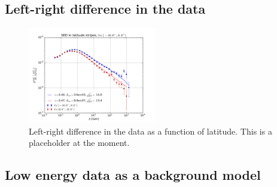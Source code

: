 \subsection{Left-right difference in the data}
\label{sec:data_diff}



\begin{figure}[h]
 \includegraphics[width=0.5\textwidth]{plots/Section3_left_right_difference.pdf}
 \caption{Left-right difference in the data as a function of latitude. This is a placeholder at the moment.}
 \label{fig:data_diff}
\end{figure}

\subsection{Low energy data as a background model}
\label{sec:le_data_model}

